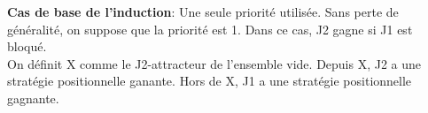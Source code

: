 \medskip
\textbf{Cas de base de l'induction}: Une seule priorit\'e utilis\'ee. Sans perte de g\'en\'eralit\'e, on suppose que la
priorit\'e est 1. Dans ce cas, J2 gagne si J1 est bloqu\'e.\\
On d\'efinit X comme le J2-attracteur de l'ensemble vide. Depuis X, J2 a une strat\'egie positionnelle ganante. Hors
de X, J1 a une strat\'egie positionnelle gagnante.
